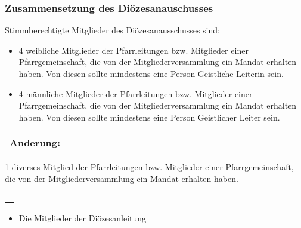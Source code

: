 \documentclass[12pt]{report}
\newcounter{tablecounter}
\newcommand\showcounter{\addtocounter{tablecounter}{1}\thetablecounter}
\begin{document}
\begin{flushleft}
\subsubsection{Zusammensetzung des Diözesanauschusses}
Stimmberechtigte Mitglieder des Diözesanausschusses sind:
\begin{itemize}
  \item 4 weibliche Mitglieder der Pfarrleitungen bzw. Mitglieder einer Pfarrgemeinschaft, die von der
        Mitgliederversammlung ein Mandat erhalten haben. Von diesen sollte mindestens eine Person
        Geistliche Leiterin sein.
  \item 4 männliche Mitglieder der Pfarrleitungen bzw. Mitglieder einer Pfarrgemeinschaft, die von
        der Mitgliederversammlung ein Mandat erhalten haben. Von diesen sollte mindestens eine
        Person Geistlicher Leiter sein.
\end{itemize}

\begin{table}[H]
 \begin{tabular}{|l|}
  \hline
  \rowcolor[HTML]{9AFF99} 
  \rule[-1ex]{0pt}{4ex}
  \begin{minipage}[t]{\textwidth}
   \textbf{Anderung:}  \showcounter
    \end{minipage}
  \\ \hline
 \end{tabular}
\end{table}

\begin{itemize}
  {\color{red}\item 1 diverses Mitglied der Pfarrleitungen bzw. Mitglieder einer Pfarrgemeinschaft, die von
        der Mitgliederversammlung ein Mandat erhalten haben.}
\end{itemize}

\begin{table}[H]
 \begin{tabular}{|l|}
  \hline
  \rowcolor[HTML]{9AFF99} 
  \rule[-1ex]{0pt}{4ex}
  \begin{minipage}[t]{\textwidth}
   \textbf{Ende\\}  
    \end{minipage}
  \\ \hline
 \end{tabular}
\end{table}

\begin{itemize}
  \item Die Mitglieder der Diözesanleitung
\end{itemize}

\end{flushleft}
\end{document}
